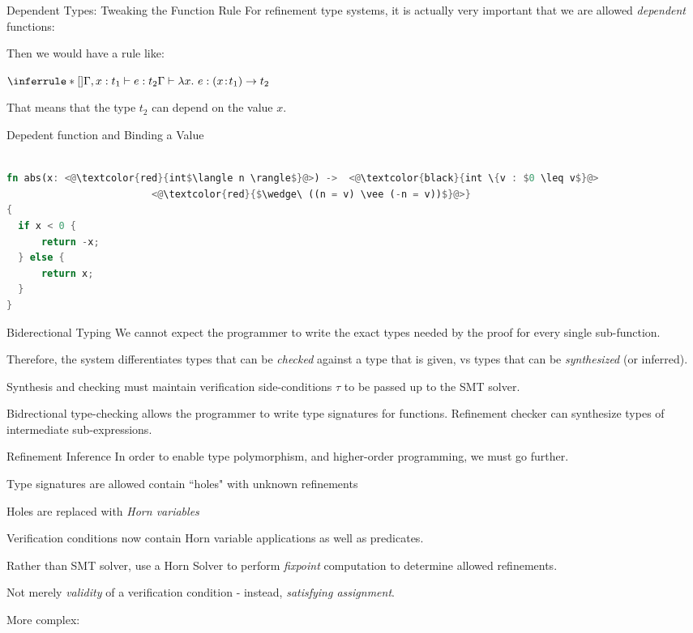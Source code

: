 \documentclass{beamer}
\begin{document}
\begin{frame}{Dependent Types: Tweaking the Function Rule} 
For refinement type systems, it is actually very important that we are allowed \emph{dependent} functions: 

\begin{block}{Then we would have a rule like:}
\begin{center}
$
\inferrule*[]{
	\Gamma, x : t_1 \vdash e : t_2
 }{ 
 \Gamma \vdash \lambda x .\ e : (x\!:\!t_1) \rightarrow t_2
}
$
\end{center} 
\end{block}

 That means that the type $t_2$ can depend on the value $x$.
\end{frame} 



\begin{frame}[fragile]
\begin{block}{Depedent function and Binding a Value}
\begin{lstlisting}[language=Rust]

fn abs(x: <@\textcolor{red}{int$\langle n \rangle$}@>) ->  <@\textcolor{black}{int \{v : $0 \leq v$}@> 
                         <@\textcolor{red}{$\wedge\ ((n = v) \vee (-n = v))$}@>} 
{ 
  if x < 0 { 
      return -x;
  } else { 
      return x;
  }
} 
\end{lstlisting}
\end{block}
\end{frame}

\begin{frame}{Biderectional Typing} 
We cannot expect the programmer to write the exact types needed by the proof for every single sub-function. 

Therefore, the system differentiates types that can be \emph{checked} against a type that is given, vs types that can be \emph{synthesized} (or inferred). 

Synthesis and checking must maintain verification side-conditions $\tau$ to be passed up to the SMT solver.

Bidrectional type-checking allows the programmer to write type signatures for functions. Refinement checker can synthesize types of intermediate sub-expressions.
\end{frame} 


\begin{frame}{Refinement Inference}
In order to enable type polymorphism, and higher-order programming, we must go further. 

Type signatures are allowed contain ``holes" with unknown refinements 

Holes are replaced with \emph{Horn variables} 

Verification conditions now contain Horn variable applications as well as predicates. 

Rather than SMT solver, use a Horn Solver to perform \emph{fixpoint} computation to determine allowed refinements. 

Not merely \emph{validity} of a verification condition - instead, \emph{satisfying assignment}.

More complex: 

\end{frame} 
\end{document}
